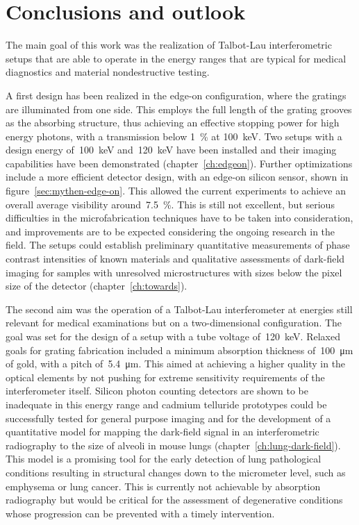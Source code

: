 \chapter{Conclusions and outlook}\label{ch:conclusions}
The main goal of this work was the realization of Talbot-Lau interferometric
setups that are able to operate in the energy ranges that are typical for
medical diagnostics and material nondestructive testing.

A first design has been realized in the edge-on configuration, where the
gratings are illuminated from one side. This employs the full length of the
grating grooves as the absorbing structure, thus achieving an effective
stopping power for high energy photons, with a transmission below
\SI{1}{\percent} at \SI{100}{\kilo\eV}. Two setups with a design energy
of~\SI{100}{\kilo\eV} and~\SI{120}{\kilo\eV} have been installed and their
imaging capabilities have been demonstrated (chapter~\ref{ch:edgeon}).
Further optimizations include a more efficient detector design, with an
edge-on silicon sensor, shown in figure~\ref{sec:mythen-edge-on}. This
allowed the current experiments to achieve an overall average visibility
around~\SI{7.5}{\percent}. This is still not excellent, but serious
difficulties in the microfabrication techniques have to be taken into
consideration, and improvements are to be expected considering the ongoing
research in the field. The setups could establish preliminary quantitative
measurements of phase contrast intensities of known materials and
qualitative assessments of dark-field imaging for samples with unresolved
microstructures with sizes below the pixel size of the detector
(chapter~\ref{ch:towards}).

The second aim was the operation of a Talbot-Lau interferometer at energies
still relevant for medical examinations but on a two-dimensional
configuration. The goal was set for the design of a setup with a tube
voltage of~\SI{120}{\kilo\eV}. Relaxed goals for grating fabrication
included a minimum absorption thickness of~\SI{100}{\micro\meter} of gold,
with a pitch of~\SI{5.4}{\micro\meter}. This aimed at achieving a higher
quality in the optical elements by not pushing for extreme sensitivity
requirements of the interferometer itself.
Silicon photon counting detectors are shown
to be inadequate in this energy range and cadmium telluride prototypes could
be successfully tested for general purpose imaging and for the development
of a quantitative model for mapping the dark-field signal in an
interferometric radiography to the size of alveoli in mouse lungs
(chapter~\ref{ch:lung-dark-field}). This model is a promising tool for the early detection of lung pathological
conditions resulting in structural changes down to the micrometer level,
such as emphysema or lung cancer. This is currently not achievable by absorption radiography but
would be critical for the assessment of degenerative conditions 
whose progression can be prevented with a timely intervention.

